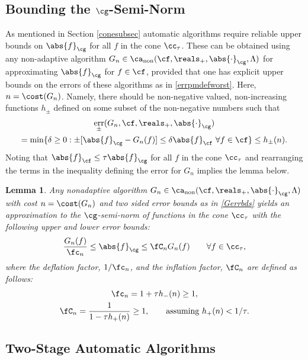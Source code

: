 \documentclass[]{elsarticle}
\DeclareMathOperator{\fix}{non}
\DeclareMathOperator{\err}{err}
\newtheorem{lem}{Lemma}
\theoremstyle{definition}
\theoremstyle{remark}
\newcommand{\Fnorm}[1]{\abs{#1}_{\cf}}
\newcommand{\Gnorm}[1]{\abs{#1}_{\cg}}
\begin{document}
\subsection{Bounding the $\cg$-Semi-Norm} \label{Galgosec}

As mentioned in Section \ref{conesubsec} automatic algorithms require reliable upper bounds on $\Gnorm{f}$ for all $f$ in the cone $\cc_{\tau}$. These can be obtained using any non-adaptive algorithm $G_n \in \ca_{\fix}(\cf,\reals_+,\Gnorm{\cdot},\Lambda)$ for approximating $\Gnorm{f}$ for $f \in \cf$, provided that one has explicit upper bounds on the errors of these algorithms as in \eqref{errpmdefworst}.  Here, $n=\cost(G_n)$. Namely, there should be non-negative valued, non-increasing functions $h_{\pm}$ defined on some subset of the non-negative numbers such that
\begin{multline} \label{Gerrbds}
\err_{\pm}(G_n,\cf,\reals_{+},\Gnorm{\cdot}) \\
= \min\{\delta \ge 0 : \pm [\Gnorm{f}- G_n(f)] \le \delta \Fnorm{f} \ \forall f \in \cf \} \le h_{ \pm}(n).
\end{multline}
Noting that $\Fnorm{f} \le \tau \Gnorm{f}$ for all $f$ in the cone $\cc_{\tau}$ and rearranging the terms in the inequality defining the error for $G_n$ implies the lemma below. 

\begin{lem} \label{Gnormlem} Any nonadaptive algorithm $G_n \in \ca_{\fix}(\cf,\reals_+,\Gnorm{\cdot},\Lambda)$ with cost $n=\cost(G_n)$ and two sided error bounds as in \eqref{Gerrbds} yields an approximation to the $\cg$-semi-norm of functions in the cone $\cc_{\tau}$ with the following upper and lower error bounds:
\begin{equation} \label{twosidedGineq}
\frac{G_n(f)}{\fc_n} \le \Gnorm{f} \le \fC_n G_n(f) \qquad \forall f \in \cc_{\tau},
\end{equation}
where the deflation factor, $1/\fc_n$, and the inflation factor, $\fC_n$ are defined as follows:
\begin{gather} \label{normdeflate}
\fc_n =1 + \tau h_{ -}(n)  \ge 1, \\
\label{norminflate}
\fC_n =\frac{1}{1 - \tau h_{ +}(n)} \ge 1, \qquad \text{assuming } h_{ +}(n) < 1/\tau.
\end{gather}
\end{lem}

\subsection{Two-Stage Automatic Algorithms} \label{twostagesec}
\end{document}
